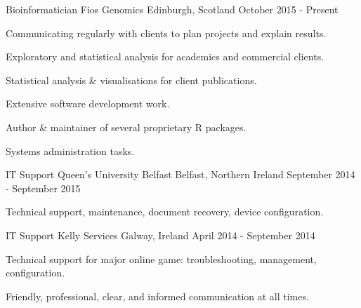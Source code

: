


\begin{cventries}
\cventry
{Bioinformatician} %
{Fios Genomics} %
{Edinburgh, Scotland} %
{October 2015 - Present} %
{ %
    \begin{cvitems}
        \item {Communicating regularly with clients to plan projects and explain results.}
        \item {Exploratory and statistical analysis for academics and commercial clients.}
        \item {Statistical analysis \& visualisations for client publications.}
        \item {Extensive software development work.}
        \item {Author \& maintainer of several proprietary R packages.}
        \item {Systems administration tasks.}
    \end{cvitems}
}
\cventry
{IT Support} %
{Queen's University Belfast} %
{Belfast, Northern Ireland} %
{September 2014 - September 2015} %
{ %
    \begin{cvitems}
        \item {Technical support, maintenance, document recovery, device configuration.}
    \end{cvitems}
}
\cventry
{IT Support} %
{Kelly Services} %
{Galway, Ireland} %
{April 2014 - September 2014} %
{ %
    \begin{cvitems}
        \item {Technical support for major online game: troubleshooting, management, configuration.}
        \item {Friendly, professional, clear, and informed communication at all times.}

\end{cvitems}}
\end{cventries}
